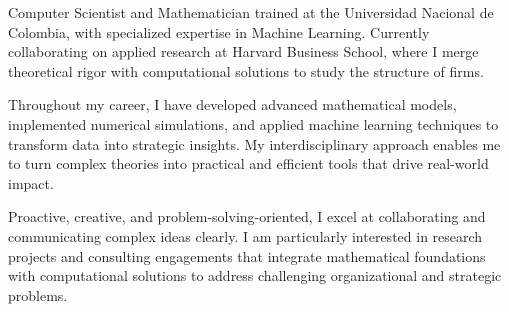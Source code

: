 \documentclass[a4paper,10pt]{article}
\begin{document}
\thispagestyle{empty}


\vspace{0.5cm}




\begin{adjustwidth}{2.5em}{1em}
Computer Scientist and Mathematician trained at the Universidad Nacional de Colombia, with specialized expertise in Machine Learning. Currently collaborating on applied research at Harvard Business School, where I merge theoretical rigor with computational solutions to study the structure of firms.


Throughout my career, I have developed advanced mathematical models, implemented numerical simulations, and applied machine learning techniques to transform data into strategic insights. My interdisciplinary approach enables me to turn complex theories into practical and efficient tools that drive real-world impact.


Proactive, creative, and problem-solving-oriented, I excel at collaborating and communicating complex ideas clearly. I am particularly interested in research projects and consulting engagements that integrate mathematical foundations with computational solutions to address challenging organizational and strategic problems.
\end{adjustwidth}


\end{document}
